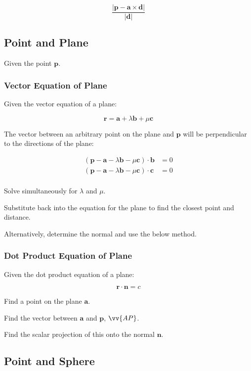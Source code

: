 \documentclass[a4paper,11pt]{article}
\newcommand{\bb}{\boldsymbol}
\begin{document}
$$
\frac{\lvert \bb{p} - \bb{a} \times \bb{d} \rvert}{\lvert \bb{d} \rvert}
$$


\subsection{Point and Plane}

Given the point $\bb{p}$.


\subsubsection{Vector Equation of Plane}

Given the vector equation of a plane:

$$
\bb{r} = \bb{a} + \lambda \bb{b} + \mu \bb{c}
$$

The vector between an arbitrary point on the plane and $\bb{p}$ will be
perpendicular to the directions of the plane:

$$
\begin{aligned}
(\bb{p} - \bb{a} - \lambda \bb{b} - \mu \bb{c}) \cdot \bb{b} & = 0 \\
(\bb{p} - \bb{a} - \lambda \bb{b} - \mu \bb{c}) \cdot \bb{c} & = 0 \\
\end{aligned}
$$

Solve simultaneously for $\lambda$ and $\mu$.

Substitute back into the equation for the plane to find the closest point and
distance.

Alternatively, determine the normal and use the below method.


\subsubsection{Dot Product Equation of Plane}

Given the dot product equation of a plane:

$$
\bb{r} \cdot \bb{n} = c
$$

Find a point on the plane $\bb{a}$.

Find the vector between $\bb{a}$ and $\bb{p}$, $\vv{AP}$.

Find the scalar projection of this onto the normal $\bb{n}$.


\subsection{Point and Sphere}
\end{document}
